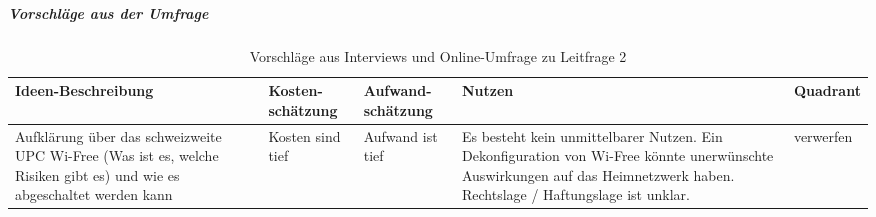 \documentclass[../../main.tex]{subfiles}
\begin{document}
\subparagraph*{Vorschläge aus der Umfrage}\mbox{}


\sloppy 

\begin{table}[H]
\tablefontsize	
\centering
\caption{Vorschläge aus Interviews und Online-Umfrage zu Leitfrage 2}
\label{vorschlaege_leitfrage2}
\begin{tabular}{ |p{3.8cm}|p{2.5cm}|p{2.5cm}|p{3.8cm}|p{3.0cm}|}

\hline
\tableheaderbgcolor
\textbf{Ideen-Beschreibung} & \textbf{Kosten-\newline schätzung} & \textbf{Aufwand-\newline schätzung} & \textbf{Nutzen} & \textbf{Quadrant}\\ 

\hline
Aufklärung über das schweizweite UPC Wi-Free (Was ist es, welche Risiken gibt es) und wie es abgeschaltet werden kann &  Kosten sind tief &  Aufwand ist tief  & Es besteht kein unmittelbarer Nutzen. Ein Dekonfiguration von Wi-Free könnte unerwünschte Auswirkungen auf das Heimnetzwerk haben. Rechtslage / Haftungslage ist unklar. & verwerfen\\
\hline

\end{tabular}
\end{table}
\end{document}
